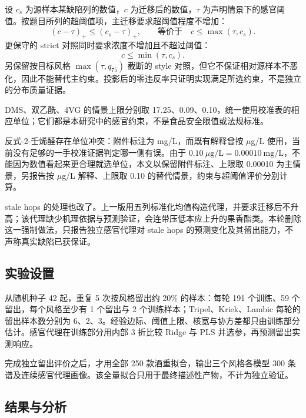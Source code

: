 \documentclass[UTF8,a4paper,zihao=-4]{ctexart}
\numberwithin{figure}{section}
\numberwithin{table}{section}
\numberwithin{equation}{section}
\begin{document}
设 $c_s$ 为源样本某缺陷列的数值，$c$ 为迁移后的数值，$\tau$ 为声明情景下的感官阈值。按题目所列的超阈值项，主迁移要求超阈值程度不增加：
\begin{equation}
\left(c-\tau\right)_{+}\le\left(c_s-\tau\right)_{+},\qquad\text{等价于}\quad c\le\max\left(\tau,c_s\right).
\label{eq:defect-main}
\end{equation}
更保守的 strict 对照同时要求浓度不增加且不超过阈值：
\begin{equation}
c\le\min\left(\tau,c_s\right).
\label{eq:defect-strict}
\end{equation}
另保留按目标风格 $\max(\tau,q_{75})$ 截断的 style 对照，但它不保证相对源样本不恶化，因此不能替代主约束。投影后的零违反率只证明实现满足所选约束，不是独立的分布质量证据。

DMS、双乙酰、4VG 的情景上限分别取 17.25、0.09、0.10，统一使用校准表的相应单位；它们都是本研究中的感官约束，不是食品安全限值或法规标准。

反式-2-壬烯醛存在单位冲突：附件标注为 mg/L，而既有解释曾按 $\mu$g/L 使用，当前没有足够的一手校准证据判定哪一侧有误。由于 $0.10\ \mu\mathrm{g/L}=0.00010\ \mathrm{mg/L}$，不能因为数值看起来更合理就选单位，本文以保留附件标注、上限取 0.00010 为主情景，另报告按 $\mu$g/L 解释、上限取 0.10 的替代情景，约束与超阈值评价分别计算。

stale hops 的处理也改了。上一版用五列标准化均值构造代理，并要求迁移后不升高；该代理缺少机理依据与预测验证，会连带压低本应上升的果香酯类。本轮删除这一强制做法，只报告独立感官代理对 stale hops 的预测变化及其留出能力，不声称真实缺陷已获保证。

\subsection{实验设置}

从随机种子 42 起，重复 5 次按风格留出约 20\% 的样本：每轮 191 个训练、59 个留出，每个风格至少有 1 个留出与 2 个训练样本；Tripel、Kriek、Lambic 每轮的留出样本数分别为 6、2、3。经验边际、阈值上限、核宽与协方差都只由训练部分估计。感官代理在训练部分用内部 3 折比较 Ridge 与 PLS 并选参，再预测留出实测响应。

完成独立留出评价之后，才用全部 250 款酒重拟合，输出三个风格各模型 300 条谱及连续感官代理画像。该全量拟合只用于最终描述性产物，不计为独立验证。

\subsection{结果与分析}
\end{document}

